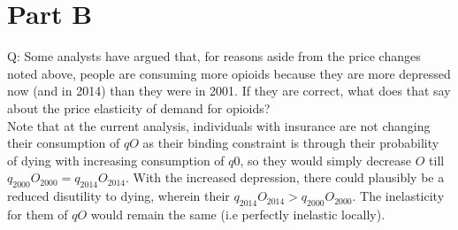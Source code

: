 \documentclass{article}
\begin{document}


\section*{Part B}
Q: Some analysts have argued that, for reasons aside from the price changes noted above, people are consuming more opioids because they are more depressed now (and in 2014) than they were in 2001. If they are correct, what does that say about the price elasticity of demand for opioids?
\\

Note that at the current analysis, individuals with insurance are not changing their consumption of $qO$ as their binding constraint is through their probability of dying with increasing consumption of $q0$, so they would simply decrease $O$ till $q_{2000}O_{2000} = q_{2014}O_{2014}$. With the increased depression, there could plausibly be a reduced disutility to dying, wherein their $ q_{2014}O_{2014}>q_{2000}O_{2000}$. The inelasticity for them of $qO$ would remain the same (i.e perfectly inelastic locally).
\end{document}
